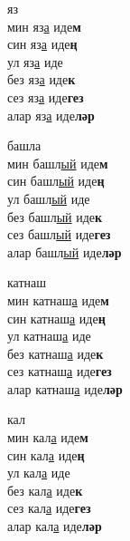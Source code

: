 \begin{multicols}{4}
\begin{enumerate}
\begin{minipage}{\linewidth}
    \item
    яз\\
    мин яз\underline{а} иде\textbf{м}\\
    син яз\underline{а} иде\textbf{ң}\\
    ул яз\underline{а} иде\\
    без яз\underline{а} иде\textbf{к}\\
    сез яз\underline{а} иде\textbf{гез}\\
    алар яз\underline{а} иде\textbf{ләр}\\
\end{minipage}

\begin{minipage}{\linewidth}
    \item
    башла\\
    мин башл\underline{ый} иде\textbf{м}\\
    син башл\underline{ый} иде\textbf{ң}\\
    ул башл\underline{ый} иде\\
    без башл\underline{ый} иде\textbf{к}\\
    сез башл\underline{ый} иде\textbf{гез}\\
    алар башл\underline{ый} иде\textbf{ләр}\\
\end{minipage}

\begin{minipage}{\linewidth}
    \item
    катнаш\\
    мин катнаш\underline{а} иде\textbf{м}\\
    син катнаш\underline{а} иде\textbf{ң}\\
    ул катнаш\underline{а} иде\\
    без катнаш\underline{а} иде\textbf{к}\\
    сез катнаш\underline{а} иде\textbf{гез}\\
    алар катнаш\underline{а} иде\textbf{ләр}\\
\end{minipage}

\begin{minipage}{\linewidth}
    \item
    кал\\
    мин кал\underline{а} иде\textbf{м}\\
    син кал\underline{а} иде\textbf{ң}\\
    ул кал\underline{а} иде\\
    без кал\underline{а} иде\textbf{к}\\
    сез кал\underline{а} иде\textbf{гез}\\
    алар кал\underline{а} иде\textbf{ләр}\\
\end{minipage}


\end{enumerate}
\end{multicols}
